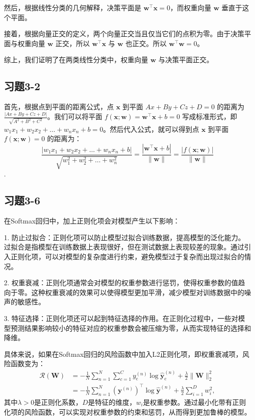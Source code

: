 \documentclass[]{article}
\begin{document}
然后，根据线性分类的几何解释，决策平面是 $\mathbf{w}^{\top} \mathbf{x} = 0$，而权重向量 $\mathbf{w}$ 垂直于这个平面。

接着，根据向量正交的定义，两个向量正交当且仅当它们的点积为零。由于决策平面与权重向量 $\mathbf{w}$ 正交，所以 $\mathbf{w}^{\top} \mathbf{x}$ 与 $\mathbf{w}$ 也正交。所以 $\mathbf{w}^{\top} \mathbf{w} = 0$。

综上，我们证明了在两类线性分类中，权重向量 $\mathbf{w}$ 与决策平面正交。
\subsection{习题3-2}
首先，根据点到平面的距离公式，点 $\mathbf{x}$ 到平面 $Ax + By + Cz + D = 0$ 的距离为 $\frac{|Ax + By + Cz + D|}{\sqrt{A^2 + B^2 + C^2}}$。我们可以将平面 $f(\mathbf{x} ; \mathbf{w}) = \mathbf{w}^{\top} \mathbf{x} + b = 0$ 写成标准形式，即 $w_1 x_1 + w_2 x_2 + \ldots + w_n x_n + b = 0$。然后代入公式，就可以得到点 $\mathbf{x}$ 到平面 $f(\mathbf{x} ; \mathbf{w}) = 0$ 的距离为：
$$\frac{|w_1 x_1 + w_2 x_2 + \ldots + w_n x_n + b|}{\sqrt{w_1^2 + w_2^2 + \ldots + w_n^2}} =\frac{|\mathbf{w}^{\top} \mathbf{x} + b|}{\|\mathbf{w}\|} =  \frac{|f(\mathbf{x} ; \mathbf{w})|}{\|\mathbf{w}\|}$$.

\subsection{习题3-6}
在Softmax回归中，加上正则化项会对模型产生以下影响：

1. 防止过拟合：正则化项可以防止模型过拟合训练数据，提高模型的泛化能力。过拟合是指模型在训练数据上表现很好，但在测试数据上表现较差的现象。通过引入正则化项，可以对模型的复杂度进行约束，避免模型过于复杂而出现过拟合的情况。

2. 权重衰减：正则化项通常会对模型的权重参数进行惩罚，使得权重参数的值趋向于零。这种权重衰减的效果可以使得模型更加平滑，减少模型对训练数据中的噪声的敏感性。

3. 特征选择：正则化项还可以起到特征选择的作用。在正则化过程中，一些对模型预测结果影响较小的特征对应的权重参数会被压缩为零，从而实现特征的选择和降维。

具体来说，如果在Softmax回归的风险函数中加入L2正则化项，即权重衰减项，风险函数变为：
$$
\begin{aligned}
	\mathcal{R}(\boldsymbol{W}) & =-\frac{1}{N} \sum_{n=1}^N \sum_{c=1}^C y_{\mathrm{c}}^{(n)} \log \hat{\boldsymbol{y}}_{\mathrm{c}}^{(n)} + \frac{\lambda}{2} \|\boldsymbol{W}\|_2^2 \\
	& =-\frac{1}{N} \sum_{n=1}^N\left(\boldsymbol{y}^{(n)}\right)^{\top} \log \hat{\boldsymbol{y}}^{(n)} + \frac{\lambda}{2} \sum_{i=1}^D w_i^2,
\end{aligned}
$$
其中$\lambda > 0$是正则化系数，$D$是特征的维度，$w_i$是权重参数。通过最小化带有正则化项的风险函数，可以实现对权重参数的约束和惩罚，从而得到更加鲁棒的模型。
\end{document}
